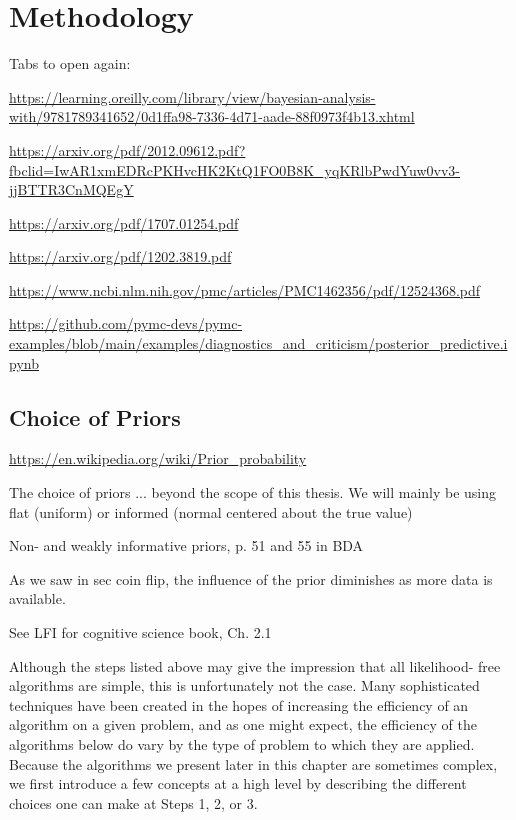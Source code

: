 \chapter{Methodology}\label{chap:methodology}


Tabs to open again:

\url{https://learning.oreilly.com/library/view/bayesian-analysis-with/9781789341652/0d1ffa98-7336-4d71-aade-88f0973f4b13.xhtml}

\url{https://arxiv.org/pdf/2012.09612.pdf?fbclid=IwAR1xmEDRcPKHvcHK2KtQ1FO0B8K_yqKRlbPwdYuw0vv3-jjBTTR3CnMQEgY}

\url{https://arxiv.org/pdf/1707.01254.pdf}

\url{https://arxiv.org/pdf/1202.3819.pdf}

\url{https://www.ncbi.nlm.nih.gov/pmc/articles/PMC1462356/pdf/12524368.pdf}

\url{https://github.com/pymc-devs/pymc-examples/blob/main/examples/diagnostics_and_criticism/posterior_predictive.ipynb}

\section{Choice of Priors}

\url{https://en.wikipedia.org/wiki/Prior_probability}


The choice of priors ... beyond the scope of this thesis. We will mainly be using flat (uniform) or informed (normal centered about the true value)

Non- and weakly informative priors, p. 51 and 55 in BDA

As we saw in sec coin flip, the influence of the prior diminishes as more data is available.  


See LFI for cognitive science book, Ch. 2.1

Although the steps listed above may give the impression that all likelihood- free algorithms are simple, this is unfortunately not the case. Many sophisticated techniques have been created in the hopes of increasing the efficiency of an algorithm on a given problem, and as one might expect, the efficiency of the algorithms below do vary by the type of problem to which they are applied. Because the algorithms we present later in this chapter are sometimes complex, we first introduce a few concepts at a high level by describing the different choices one can make at Steps 1, 2, or 3.



